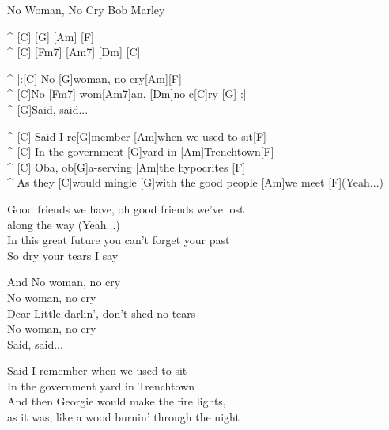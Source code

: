 \begin{song}{No Woman, No Cry }{Bob Marley}

\begin{guitar}
^ [C] [G] [Am] [F] \\
^ [C] [Fm7] [Am7] [Dm] [C]\\
\end{guitar}

\begin{guitar}
^ |:[C] No [G]woman, no cry[Am][F]\\
^ [C]No [Fm7] wom[Am7]an,  [Dm]no c[C]ry [G]  :|\\
^ [G]Said, said...\\
\end{guitar}

\begin{guitar}
^ [C] Said I re[G]member [Am]when we used to sit[F]\\
^ [C] In the government [G]yard in [Am]Trenchtown[F]\\
^ [C] Oba, ob[G]a-serving [Am]the hypocrites [F]\\
^ As they [C]would mingle [G]with the good people [Am]we meet   [F](Yeah...)\\
\end{guitar}

\begin{guitar}
Good friends we have, oh good friends we've lost \\
along the way    (Yeah...)\\
In this great future you can't forget your past\\
So dry your tears I say\\
\end{guitar}

\begin{guitar}
And No woman, no cry\\
No  woman, no cry\\
Dear Little darlin', don't shed no tears\\
No  woman, no cry\\
Said, said...\\
\end{guitar}

\begin{guitar}
Said I remember when we used to sit\\
In the government yard in Trenchtown\\
And then Georgie would make the fire lights,\\
as it was, like a wood burnin' through the night\\
\end{guitar}


\end{song}
